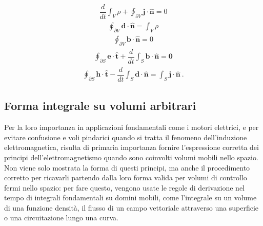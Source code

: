 \documentclass[letterpaper,10pt,english]{jupyterBook}
\begin{document}
\sphinxAtStartPar
{}
\begin{equation*}
\begin{split}
    \dfrac{d}{dt} \int_{V} \rho + \oint_{\partial V} \mathbf{j} \cdot \hat{\mathbf{n}} = 0
\end{split}
\end{equation*}
\sphinxAtStartPar
{}
\begin{equation*}
\begin{split}
    \oint_{\partial V} \mathbf{d} \cdot \mathbf{\hat{n}} = \int_{V} \rho
\end{split}
\end{equation*}
\sphinxAtStartPar
{}
\begin{equation*}
\begin{split}
    \oint_{\partial V} \mathbf{b} \cdot \mathbf{\hat{n}} = 0
\end{split}
\end{equation*}
\sphinxAtStartPar
{}
\begin{equation*}
\begin{split}
    \oint_{\partial S} \mathbf{e} \cdot \hat{\mathbf{t}} + \dfrac{d}{dt} \int_{S} \mathbf{b} \cdot \hat{\mathbf{n}} = \mathbf{0}
\end{split}
\end{equation*}
\sphinxAtStartPar
{}
\begin{equation*}
\begin{split}
    \oint_{\partial S} \mathbf{h} \cdot \hat{\mathbf{t}} - \dfrac{d}{dt} \int_{S} \mathbf{d} \cdot \hat{\mathbf{n}} = \int_{S} \mathbf{j} \cdot \hat{\mathbf{n}} \ .
\end{split}
\end{equation*}

\subsection{Forma integrale su volumi arbitrari}
\label{\detokenize{ch/principles:forma-integrale-su-volumi-arbitrari}}
\sphinxAtStartPar
Per la loro importanza in applicazioni fondamentali come i motori elettrici, e per evitare confusione e voli pindarici quando si tratta il fenomeno dell’induzione elettromagnetica, risulta di primaria importanza fornire l’espressione corretta dei principi dell’elettromagnetismo quando sono coinvolti volumi mobili nello spazio. Non viene solo mostrata la forma di questi principi, ma anche il procedimento corretto per ricavarli partendo dalla loro forma valida per volumi di controllo fermi nello spazio: per fare questo, vengono usate le regole di derivazione nel tempo di integrali fondamentali su domini mobili, come l’integrale su un volume di una funzione densità, il flusso di un campo vettoriale attraverso una superficie o una circuitazione lungo una curva.
\end{document}
